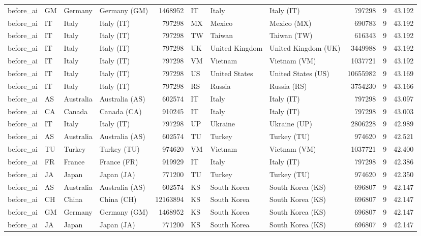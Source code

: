 \begin{tabular}{llllrlllrrr}
before\_ai & GM & Germany & Germany (GM) & 1468952 & IT & Italy & Italy (IT) & 797298 & 9 & 43.192 \\
before\_ai & IT & Italy & Italy (IT) & 797298 & MX & Mexico & Mexico (MX) & 690783 & 9 & 43.192 \\
before\_ai & IT & Italy & Italy (IT) & 797298 & TW & Taiwan & Taiwan (TW) & 616343 & 9 & 43.192 \\
before\_ai & IT & Italy & Italy (IT) & 797298 & UK & United Kingdom & United Kingdom (UK) & 3449988 & 9 & 43.192 \\
before\_ai & IT & Italy & Italy (IT) & 797298 & VM & Vietnam & Vietnam (VM) & 1037721 & 9 & 43.192 \\
before\_ai & IT & Italy & Italy (IT) & 797298 & US & United States & United States (US) & 10655982 & 9 & 43.169 \\
before\_ai & IT & Italy & Italy (IT) & 797298 & RS & Russia & Russia (RS) & 3754230 & 9 & 43.166 \\
before\_ai & AS & Australia & Australia (AS) & 602574 & IT & Italy & Italy (IT) & 797298 & 9 & 43.097 \\
before\_ai & CA & Canada & Canada (CA) & 910245 & IT & Italy & Italy (IT) & 797298 & 9 & 43.003 \\
before\_ai & IT & Italy & Italy (IT) & 797298 & UP & Ukraine & Ukraine (UP) & 2806228 & 9 & 42.989 \\
before\_ai & AS & Australia & Australia (AS) & 602574 & TU & Turkey & Turkey (TU) & 974620 & 9 & 42.521 \\
before\_ai & TU & Turkey & Turkey (TU) & 974620 & VM & Vietnam & Vietnam (VM) & 1037721 & 9 & 42.400 \\
before\_ai & FR & France & France (FR) & 919929 & IT & Italy & Italy (IT) & 797298 & 9 & 42.386 \\
before\_ai & JA & Japan & Japan (JA) & 771200 & TU & Turkey & Turkey (TU) & 974620 & 9 & 42.350 \\
before\_ai & AS & Australia & Australia (AS) & 602574 & KS & South Korea & South Korea (KS) & 696807 & 9 & 42.147 \\
before\_ai & CH & China & China (CH) & 12163894 & KS & South Korea & South Korea (KS) & 696807 & 9 & 42.147 \\
before\_ai & GM & Germany & Germany (GM) & 1468952 & KS & South Korea & South Korea (KS) & 696807 & 9 & 42.147 \\
before\_ai & JA & Japan & Japan (JA) & 771200 & KS & South Korea & South Korea (KS) & 696807 & 9 & 42.147 \\

\end{tabular}
